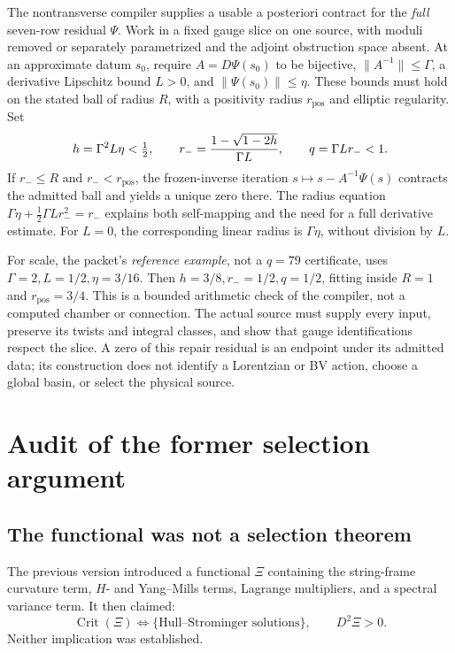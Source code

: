 \documentclass[11pt]{article}
\theoremstyle{definition}
\theoremstyle{remark}
\newcommand{\HS}{Hull--Strominger}
\begin{document}
The nontransverse compiler \cite{FRG3Z} supplies a usable a posteriori contract
for the \emph{full} seven-row residual \(\Psi\).  Work in a fixed gauge slice
on one source, with moduli removed or separately parametrized and the adjoint
obstruction space absent.  At an approximate datum \(s_0\), require
\(A=D\Psi(s_0)\) to be bijective, \(\|A^{-1}\|\le\Gamma\), a derivative
Lipschitz bound \(L>0\), and \(\|\Psi(s_0)\|\le\eta\).  These bounds must
hold on the stated ball of radius \(R\), with a positivity radius
\(r_{\mathrm{pos}}\) and elliptic regularity.  Set
\[
h=\Gamma^2L\eta<\tfrac12,\qquad
r_-={1-\sqrt{1-2h}\over\Gamma L},\qquad
q=\Gamma Lr_-<1.
\]
If \(r_-\le R\) and \(r_-<r_{\mathrm{pos}}\), the frozen-inverse iteration
\(s\mapsto s-A^{-1}\Psi(s)\) contracts the admitted ball and yields a unique
zero there.  The radius equation
\(\Gamma\eta+\tfrac12\Gamma Lr_-^2=r_-\) explains both self-mapping and the
need for a full derivative estimate.  For \(L=0\), the corresponding linear
radius is \(\Gamma\eta\), without division by \(L\).

For scale, the packet's \emph{reference example}, not a \(q=79\)
certificate, uses \(\Gamma=2,L=1/2,\eta=3/16\).  Then
\(h=3/8,r_-=1/2,q=1/2\), fitting inside \(R=1\) and
\(r_{\mathrm{pos}}=3/4\).  This is a bounded arithmetic check of the compiler,
not a computed chamber or connection.  The actual source must supply every
input, preserve its twists and integral classes, and show that gauge
identifications respect the slice.  A zero of this repair residual is an
endpoint under its admitted data; its construction does not identify a
Lorentzian or BV action, choose a global basin, or select the physical source.

\section{Audit of the former selection argument}
\label{sec:audit}

\subsection{The functional was not a selection theorem}

The previous version introduced a functional \(\Xi\) containing the
string-frame curvature term, \(H\)- and Yang--Mills terms, Lagrange
multipliers, and a spectral variance term.  It then claimed:
\[
\operatorname{Crit}(\Xi)
\Longleftrightarrow
\{\text{\HS{} solutions}\},
\qquad
D^2\Xi>0.
\]
Neither implication was established.
\end{document}
